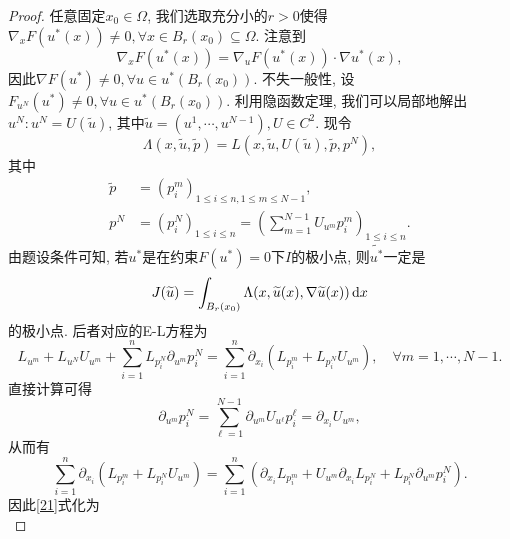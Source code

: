\begin{proposition}
\begin{proof}
        任意固定$x_0 \in \Omega$, 我们选取充分小的$ r > 0$使得$\nabla_x F(u^*(x)) \neq 0, \forall x \in B_r(x_0) \subseteq \Omega$.
        注意到 
        \begin{equation*}
            \nabla_xF(u^*(x)) = \nabla_uF(u^*(x)) \cdot \nabla u^*(x),
        \end{equation*}
        因此$\nabla F(u^*) \neq 0, \forall u \in u^*(B_r(x_0))$. 不失一般性, 设$F_{u^N}(u^*) \neq 0, \forall u \in u^*(B_r(x_0))$.
        利用隐函数定理, 我们可以局部地解出$u^N\colon u^N = U(\widetilde{u})$, 其中$\widetilde{u} = (u^1, \cdots, u^{N - 1}), U \in C^2$.
        现令 
        \begin{equation*}
            \Lambda(x, \widetilde{u}, \widetilde{p}) = L(x, \widetilde{u}, U(\widetilde{u}), \widetilde{p}, p^N),
        \end{equation*}
        其中
        \begin{align*}
            \widetilde{p} &= (p_i^m)_{1 \leq i \leq n, 1 \leq m \leq N - 1}, \\ 
            p^N &= (p_i^N)_{1 \leq i \leq n} = \left(\sum_{m = 1}^{N -1}U_{u^m}p_i^m\right)_{1 \leq i \leq n}.
        \end{align*}
        由题设条件可知, 若$u^*$是在约束$F(u^*) = 0$下$I$的极小点, 则$\widetilde{u^*}$一定是
        \begin{equation*}
            J(\widetilde{u}) = \int_{B_r(x_0)}\Lambda(x, \widetilde{u}(x), \nabla\widetilde{u}(x)) \,{\rm d}x
        \end{equation*}
        的极小点. 后者对应的E-L方程为
        \begin{equation}\label{21}
            L_{u^m} + L_{u^N}U_{u^m} + \sum_{i = 1}^nL_{p_i^N}\partial_{u^m}p_i^N = \sum_{i = 1}^n\partial_{x_i}(L_{p_i^m} + L_{p_i^N}U_{u^m}), \quad \forall m = 1, \cdots, N - 1.
        \end{equation} 
        直接计算可得 
        \begin{equation*}
            \partial_{u^m}p_i^N = \sum_{\ell = 1}^{N - 1}\partial_{u^m}U_{u^{\ell}}p_i^\ell =\partial_{x_i}U_{u^m},
        \end{equation*}
        从而有  
        \begin{equation*}
            \sum_{i = 1}^n\partial_{x_i}(L_{p_i^m} + L_{p_i^N}U_{u^m}) = \sum_{i = 1}^n(\partial_{x_i}L_{p_i^m} + U_{u^m}\partial_{x_i}L_{p_i^N} +L_{p_i^N}\partial_{u^m}p_i^N).
        \end{equation*}
        因此\eqref{21}式化为 
        \begin{equation}\label{22}

\end{equation}
\end{proof}
\end{proposition}
